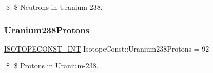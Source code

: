 \$ \$ Neutrons in Uranium-\/238. \mbox{\label{group___isotope_const-_uranium-_u238_gaf78ea13487c57359f79970f76b5ffa6a}} 
\subsubsection{\texorpdfstring{Uranium238\+Protons}{Uranium238Protons}}
{\footnotesize\ttfamily \mbox{\hyperlink{group___isotope_const-_macros_ga5f18360b3e99483a35c32d789e62621c}{I\+S\+O\+T\+O\+P\+E\+C\+O\+N\+S\+T\+\_\+\+I\+NT}} Isotope\+Const\+::\+Uranium238\+Protons = 92}

\$ \$ Protons in Uranium-\/238. 